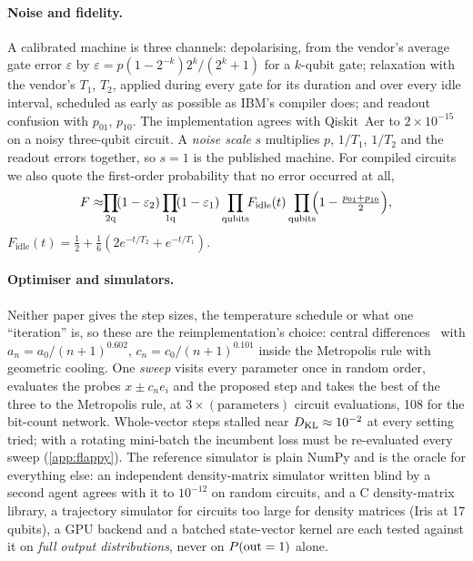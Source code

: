 \paragraph{Noise and fidelity.}
A calibrated machine is three channels: depolarising, from the vendor's average gate error
$\varepsilon$ by $\varepsilon=p(1-2^{-k})2^k/(2^k+1)$ for a $k$-qubit gate; relaxation with the
vendor's $T_1$, $T_2$, applied during every gate for its duration and over every idle interval,
scheduled as early as possible as IBM's compiler does; and readout confusion with $p_{01}$,
$p_{10}$.  The implementation agrees with Qiskit~Aer to $2\times10^{-15}$ on a noisy
three-qubit circuit.  A \emph{noise scale} $s$ multiplies $p$, $1/T_1$, $1/T_2$ and the readout
errors together, so $s=1$ is the published machine.  For compiled circuits we also quote the
first-order probability that no error occurred at all,
\begin{equation}
F \approx \!\!\prod_{\text{2q}}\!(1-\varepsilon_{2})
          \prod_{\text{1q}}\!(1-\varepsilon_{1})
          \prod_{\text{qubits}}\!\! F_{\mathrm{idle}}(t)
          \prod_{\text{qubits}}\!\!\Bigl(1-\tfrac{p_{01}+p_{10}}{2}\Bigr),
\label{eq:agentic-fidelity}
\end{equation}
$F_{\mathrm{idle}}(t)=\tfrac12+\tfrac16(2e^{-t/T_2}+e^{-t/T_1})$.

\paragraph{Optimiser and simulators.}
Neither paper gives the step sizes, the temperature schedule or what one ``iteration'' is, so
these are the reimplementation's choice: central
differences~\cite{Kiefer52} with $a_n=a_0/(n+1)^{0.602}$, $c_n=c_0/(n+1)^{0.101}$ inside the
Metropolis rule with geometric cooling.  One \emph{sweep} visits every parameter once in random
order, evaluates the probes $x\pm c_ne_i$ and the proposed step and takes the best of the three
to the Metropolis rule, at $3\times(\text{parameters})$ circuit evaluations, 108 for the
bit-count network.  Whole-vector steps stalled near $D_{\mathrm{KL}}\approx10^{-2}$ at every setting tried;
with a rotating mini-batch the incumbent loss must be re-evaluated every sweep
(\cref{app:flappy}).  The reference simulator is plain NumPy and is the oracle for everything
else: an independent density-matrix simulator written blind by a second agent agrees with it to
$10^{-12}$ on random circuits, and a C density-matrix library, a trajectory simulator for
circuits too large for density matrices (Iris at 17 qubits), a GPU backend and a batched
state-vector kernel are each tested against it on \emph{full output distributions}, never on
$P(\mathrm{out}=1)$ alone.


